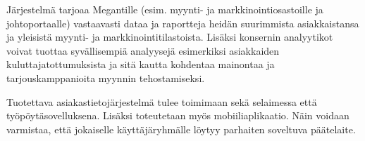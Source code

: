    Järjestelmä tarjoaa Megantille (esim. myynti- ja markkinointiosastoille ja johtoportaalle) vastaavasti dataa ja raportteja heidän 
    suurimmista asiakkaistansa ja yleisistä myynti- ja markkinointitilastoista. Lisäksi konsernin analyytikot voivat tuottaa syvällisempiä 
    analyysejä esimerkiksi asiakkaiden kuluttajatottumuksista ja sitä kautta kohdentaa mainontaa ja tarjouskamppanioita myynnin tehostamiseksi.

    Tuotettava asiakastietojärjestelmä tulee toimimaan sekä selaimessa että työpöytä\-sovelluksena. Lisäksi toteutetaan myös mobiiliaplikaatio.
    Näin voidaan varmistaa, että jokaiselle käyttäjäryhmälle löytyy parhaiten soveltuva päätelaite.
